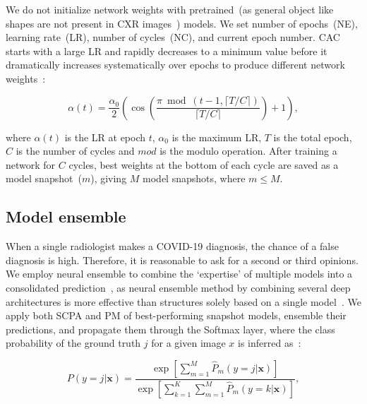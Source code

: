 \documentclass[conference]{IEEEtran}
\begin{document}
\fi
We do not initialize network weights with pretrained~(as general object like shapes are not present in CXR images~\cite{karimdeepcovidexplainer}) models. We set number of epochs~(NE), learning rate~(LR), number of cycles~(NC), and current epoch number. CAC starts with a large LR and rapidly decreases to a minimum value before it dramatically increases systematically over epochs to produce different network weights~\cite{huang2017snapshot}: 

\vspace{-2mm}
\begin{equation}
    \label{eq:lr-cosine}
    \alpha(t)=\frac{\alpha_{0}}{2}\left(\cos \left(\frac{\pi \bmod (t-1,\lceil T / C\rceil)}{\lceil T / C\rceil}\right)+1\right),%
\end{equation}

where $\alpha(t)$ is the LR at epoch $t$, $\alpha_0$ is the maximum LR, $T$ is the total epoch, $C$ is the number of cycles and $mod$ is the modulo operation. After training a network for $C$ cycles, best weights at the bottom of each cycle are saved as a model snapshot~($m$), giving $M$ model snapshots, where $m \leq M$. 

\subsection{Model ensemble}
When a single radiologist makes a COVID-19 diagnosis, the chance of a false diagnosis is high. Therefore, it is reasonable to ask for a second or third opinions. %
We employ neural ensemble to combine the `expertise' of multiple models into a consolidated prediction~\cite{huang2017snapshot}, as neural ensemble method by combining several deep architectures is more effective than structures solely based on a single model~\cite{huang2017snapshot,karim2019snapshot}. 
We apply both SCPA and PM of best-performing snapshot models, ensemble their predictions, and propagate them through the Softmax layer, where the class probability of the ground truth $j$ for a given image $x$ is inferred as~\cite{7}:

\vspace{-2mm}
\begin{equation}
    P(y=j | \mathbf{x})=\frac{\exp \left[\sum_{m=1}^{M} \hat{P}_{m}(y=j | \mathbf{x})\right]}{\exp \left[\sum_{k=1}^{K} \sum_{m=1}^{M} \hat{P}_{m}(y=k | \mathbf{x})\right]},%
\end{equation}
\end{document}
